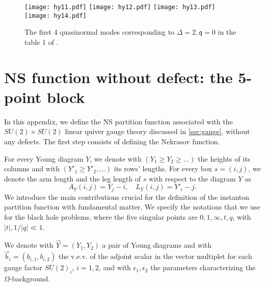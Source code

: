 \documentclass[11pt]{article}
\numberwithin{equation}{section}
\begin{document}
\begin{figure}[h!]
    \centering
    \texttt{[image: hy11.pdf]} 
    \texttt{[image: hy12.pdf]}
    \texttt{[image: hy13.pdf]}
    \texttt{[image: hy14.pdf]}
    \caption{The first 4 quasinormal modes corresponding to $\Delta=2, \mathfrak{q}=0$ in the table 1 of \cite{Nunez:2003eq}.}
\label{fig:hydro}
\end{figure}








\appendix
\section{NS function without defect: the 5-point block}\label{appendixA}

In this appendix, we define the NS partition function associated with the $SU(2) \times SU(2)$  linear quiver gauge theory discussed in \autoref{sec:gauge}, without any defects. The first step consists of defining the Nekrasov function.

For every Young diagram $Y$, we denote with $(Y_1\ge Y_2\ge\dots)$ the heights of its columns and with $(Y'_1\ge Y'_2,\dots)$ its rows' lengths. For every box $s=(i,j)$, we denote the arm length and the leg length of $s$ with respect to the diagram $Y$ as
\begin{equation}
A_Y(i, j) = Y_j -  i, \quad L_Y(i, j) =Y'_i - j.
\end{equation}
We introduce the main contributions crucial for the definition of the instanton partition function 
with fundamental matter. We specify the notations that we use for the black hole problems, where the five singular points are $0,1,\infty,t,q$, with $|t|,1/|q|\ll 1$. 

We denote with $\vec{Y}=\left( Y_1, Y_2 \right)$ a pair of Young diagrams and with $\vec{b}_i=(b_{i,1},b_{i,2})$ the v.e.v. of the adjoint scalar in the vector multiplet for each gauge factor $SU(2)_i$, $i=1,2$, and with $\epsilon_1,\epsilon_2$ the parameters characterizing the $\Omega$-background.  
\end{document}
